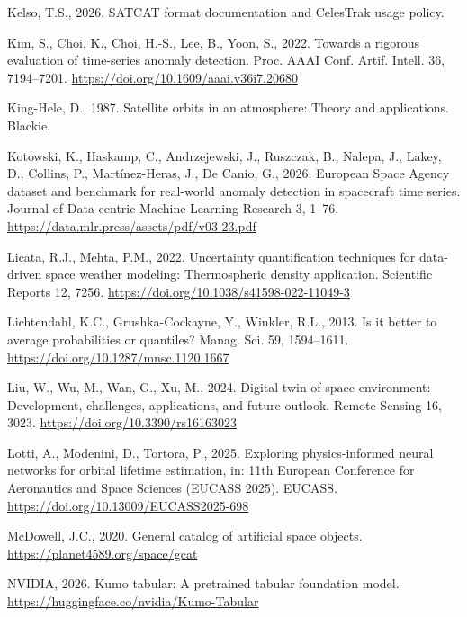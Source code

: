 \documentclass[
]{article}
\newlength{\cslhangindent}
\newenvironment{CSLReferences}[2] %
 {\begin{list}{}{%
  \setlength{\itemindent}{0pt}
  \setlength{\leftmargin}{0pt}
  \setlength{\parsep}{0pt}
  \ifodd #1
   \setlength{\leftmargin}{\cslhangindent}
   \setlength{\itemindent}{-1\cslhangindent}
  \fi
  \setlength{\itemsep}{#2\baselineskip}}}
 {\end{list}}
\begin{document}
\begin{CSLReferences}{1}{0}
Kelso, T.S., 2026. {SATCAT} format documentation and {CelesTrak} usage
policy.

Kim, S., Choi, K., Choi, H.-S., Lee, B., Yoon, S., 2022. Towards a
rigorous evaluation of time-series anomaly detection. Proc. {AAAI} Conf.
Artif. Intell. 36, 7194--7201.
\url{https://doi.org/10.1609/aaai.v36i7.20680}

King-Hele, D., 1987. Satellite orbits in an atmosphere: Theory and
applications. Blackie.

Kotowski, K., Haskamp, C., Andrzejewski, J., Ruszczak, B., Nalepa, J.,
Lakey, D., Collins, P., Martínez-Heras, J., De Canio, G., 2026.
{European Space Agency} dataset and benchmark for real-world anomaly
detection in spacecraft time series. Journal of Data-centric Machine
Learning Research 3, 1--76.
\url{https://data.mlr.press/assets/pdf/v03-23.pdf}

Licata, R.J., Mehta, P.M., 2022. Uncertainty quantification techniques
for data-driven space weather modeling: Thermospheric density
application. Scientific Reports 12, 7256.
\url{https://doi.org/10.1038/s41598-022-11049-3}

Lichtendahl, K.C., Grushka-Cockayne, Y., Winkler, R.L., 2013. Is it
better to average probabilities or quantiles? Manag. Sci. 59,
1594--1611. \url{https://doi.org/10.1287/mnsc.1120.1667}

Liu, W., Wu, M., Wan, G., Xu, M., 2024. Digital twin of space
environment: Development, challenges, applications, and future outlook.
Remote Sensing 16, 3023. \url{https://doi.org/10.3390/rs16163023}

Lotti, A., Modenini, D., Tortora, P., 2025. Exploring physics-informed
neural networks for orbital lifetime estimation, in: 11th European
Conference for Aeronautics and Space Sciences (EUCASS 2025). EUCASS.
\url{https://doi.org/10.13009/EUCASS2025-698}

McDowell, J.C., 2020. General catalog of artificial space objects.
\url{https://planet4589.org/space/gcat}

NVIDIA, 2026. Kumo tabular: A pretrained tabular foundation model.
\url{https://huggingface.co/nvidia/Kumo-Tabular}


\end{CSLReferences}
\end{document}
